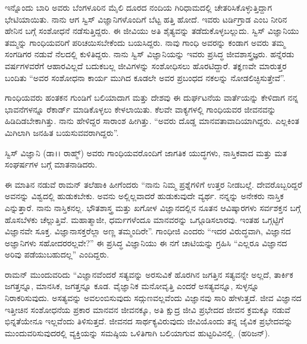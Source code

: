 ಇನ್ನೊಂದು ಬಾರಿ ಅವರು ಬೆಂಗಳೂರಿನ  ಮೈಲಿ ದೂರದ ನಂದಿಯ ಗಿರಿಧಾಮದಲ್ಲಿ ಚೇತರಿಸಿಕೊಳ್ಳುತ್ತಿದ್ದಾಗ ಭೇಟಿಯಾಯಿತು. ನಾನು ಆಗ ಸ್ವಿಸ್ ವಿಜ್ಞಾನಿಗಳೊಂದಿಗೆ ಬೆಟ್ಟ ಹತ್ತಿ ಹೋದೆ. ಇವರು ಟರ್ಡಿಗ್ರಾಡ ಎಂಬ ನೀರಿನ ಹೇನಿನ ಬಗ್ಗೆ ಸಂಶೋಧನೆ ನಡೆಸುತ್ತಿದ್ದರು. ಈ ಜೀವಿಯು ಅತಿ ಶೈತ್ಯವನ್ನು ತಡೆದುಕೊಳ್ಳಬಲ್ಲುದು. ಸ್ವಿಸ್ ವಿಜ್ಞಾನಿಯು ತಮ್ಮನ್ನು ಗಾಂಧಿಯವರಿಗೆ ಪರಿಚಯಿಸಬೇಕೆಂದು ಬಯಸಿದ್ದರು. ನಾವು ಗಾಂಧಿ ಅವರನ್ನು ಕಂಡಾಗ ಅವರು ತಮ್ಮ ಸಂಗಡಿಗರ ನಡುವೆ ನೆಲದಲ್ಲಿ ಕುಳಿತಿದ್ದರು. ನಾನು ಸ್ವಿಸ್ ವಿಜ್ಞಾನಿಯನ್ನು ಇವರು ಪ್ರಸಿದ್ಧ ಜೀವಶಾಸ್ತ್ರಜ್ಞರು. ಹನ್ನೆರಡು ವರ್ಷಗಳವರೆಗೆ ಆಹಾರವಿಲ್ಲದೆ ಬದುಕಬಲ್ಲ ಜೀವಿಗಳನ್ನು ಸಂಶೋಧಿಸಲು ಹೊರಟಿದ್ದಾರೆ. ತಕ್ಞಣವೇ ಮಾರುತ್ತರ ಬಂದಿತು “ಅವರ ಸಂಶೋಧನಾ ಕಾರ್ಯ ಮುಗಿದ ಕೂಡಲೇ ಅವರ ಪ್ರಬಂಧದ ನಕಲನ್ನು ನೋಡಲಿಚ್ಛಿಸುತ್ತೇವೆ”.

ಗಾಂಧಿಯವರು ಹಂತಕನ ಗುಂಡಿಗೆ ಬಲಿಯಾದಾಗ ಮತ್ತು ದೇಶವು ಈ ದುರ್ಘಟನೆಯ ವಾರ್ತೆಯನ್ನು ಕೇಳಿದಾಗ ನನ್ನ ಭಾವನೆಗಳನ್ನೂ ರೆಕಾರ್ಡ್ ಮಾಡಿಕೊಳ್ಳಲು ಕೇಳಲಾಯಿತು. ಕೆಲವೇ ವಾಕ್ಯಗಳಲ್ಲಿ ಗಾಂಧಿಯವರ ಜೀವನವನ್ನು ಹಿಡಿದಿಡಬೇಕಾಗಿತ್ತು. ನಾನು ಹೇಳಿದ್ದರ ಸಾರಾಂಶ ಹೀಗಿತ್ತು. “ಅವರು ದೊಡ್ಡ ಮಾನವತಾವಾದಿಯಾಗಿದ್ದರು. ಎಲ್ಲಕಿಂತ ಮಿಗಿಲಾಗಿ ಜನಹಿತ ಬಯಸುವವರಾಗಿದ್ದರು”.

ಸ್ವಿಸ್ ವಿಜ್ಞಾನಿ (ಡಾ।। ರಾಹ್ಮ್) ಅವರು ಗಾಂಧಿಯವರೊಂದಿಗೆ ಜಾಗತಿಕ ಯುದ್ಧಗಳು, ನಾಸ್ತಿಕವಾದ ಮತ್ತು ಮತ ಸಂಘರ್ಷಗಳ ಬಗ್ಗೆ ಮಾತನಾಡಿದರು.

ಈ ಮಾತಿನ ನಡುವೆ ರಾಮನ್ ತಲೆಹಾಕಿ ಹೀಗೆಂದರು “ನಾನು ನಿಮ್ಮ ಪ್ರಶ್ನೆಗಳಿಗೆ ಉತ್ತರ ನೀಡಬಲ್ಲೆ. ದೇವರೊಬ್ಬರಿದ್ದರೆ ಅವನನ್ನು ವಿಶ್ವದಲ್ಲಿ ಹುಡುಕಬೇಕು. ಅವನು ಅಲ್ಲಿಲ್ಲವಾದರೆ ಹುಡುಕುವುದೇ ವ್ಯರ್ಥ. ನನ್ನನ್ನು ಅನೇಕರು ನಾಸ್ತಿಕ ಎನ್ನುತ್ತಾರೆ. ನಾನು ನಾಸ್ತಿಕನಲ್ಲ. ಭೌತಶಾಸ್ತ್ರ ಮತ್ತು ಖಗೋಳ ವಿಜ್ಞಾನದಲ್ಲಿನ ನೂತನ ಆವಿಷ್ಕಾರಗಳು ಸರ್ವಶಕ್ತನ ಬಗ್ಗೆ ಹೊಸಬೆಳಕು ಚೆಲ್ಲುತ್ತಿವೆ. ಮಹಾತ್ಮಾಜೀ, ಧರ್ಮಗಳೆಂದೂ ಮಾನವರನ್ನು ಒಗ್ಗೂಡಿಸಲಾರವು. ಇಂತಹ ಒಗ್ಗಟ್ಟಿಗೆ ವಿಜ್ಞಾನವೇ ಸೂಕ್ತ. ವಿಜ್ಞಾನಾಸಕ್ತರೆಲ್ಲಾ ಅಣ್ಣ ತಮ್ಮಂದಿರೇ”. ಗಾಂಧೀಜಿ ಎಂದರು\enginline{-} “ಇದರ ವಿರುದ್ಧವಾಗಿ, ವಿಜ್ಞಾನದ ಅಜ್ಞಾನಿಗಳು ಸಹೋದರರಲ್ಲವೇ?” ಈ ಪ್ರಸಿದ್ಧ ವಿಜ್ಞಾನಿಯು ಈ ನಗೆ ಚಾಟಿಯನ್ನು ಗ್ರಹಿಸಿ \enginline{-} “ಎಲ್ಲರೂ ವಿಜ್ಞಾನದ ಅರಿವು ಪಡೆಯುಬಹುದಲ್ಲ” ಎಂದಿದ್ದರು.

ರಾಮನ್ ಮುಂದುವರಿದು \enginline{-} “ವಿಜ್ಞಾನವೆಂದರೆ ಸತ್ಯವನ್ನು ಅರಸುವಿಕೆ \enginline{-} ಹೊರಗಿನ ಜಗತ್ತಿನ ಸತ್ಯವನ್ನೇ ಅಲ್ಲದೆ, ತಾರ್ಕಿಕ ಜಗತ್ತನ್ನೂ, ಮಾನಸಿಕ, ಜಗತ್ತನ್ನೂ ಕೂಡ. ವೈಜ್ಞಾನಿಕ ಮನೋವೃತ್ತಿ ಎಂದರೆ ಅಸತ್ಯವನ್ನೂ, ಸುಳ್ಳನ್ನೂ ನಿರಾಕರಿಸುವುದು. ಅಸತ್ಯವನ್ನು ಅವಲಂಬಿಸುವುದು ಸದ್ಗುಣವಲ್ಲವೆಂದು ವಿಜ್ಞಾನವು ಸಾರಿ ಹೇಳುತ್ತದೆ. ಜೀವ ವಿಜ್ಞಾನದ ಇತ್ತೀಚಿನ ಸಂಶೋಧನೆಯ ಪ್ರಕಾರ ಮಾನವನ ಜೀವನಕ್ಕೂ, ಅತಿ ಕ್ಷುದ್ರ ಜೀವಿ ಪ್ರಭೇದದ ಜೀವನ ಕ್ರಮಕ್ಕೂ ನಡುವೆ ಭಿನ್ನತೆಯೇನೂ ಇಲ್ಲವೆಂದು ತಿಳಿಸುತ್ತದೆ. ಜೀವನದ ಸಾರ್ಥಕ್ಯವಿರುವುದು ಜೀವಿಯೊಂದು ತನ್ನ ಜೈವಿಕ ಪ್ರಭೇದವನ್ನು ಮುಂದುವರಿಸುವುದರಲ್ಲಿ \enginline{-} ವ್ಯಕ್ತಿಯನ್ನು ಸಮಷ್ಠಿಯ ಒಳಿತಿಗಾಗಿ ಬಲಿಯಾಗುವ ಹುಟ್ಟರಿವಿನಲ್ಲಿ. (ಹರಿಜನ್\enginline{-}).

